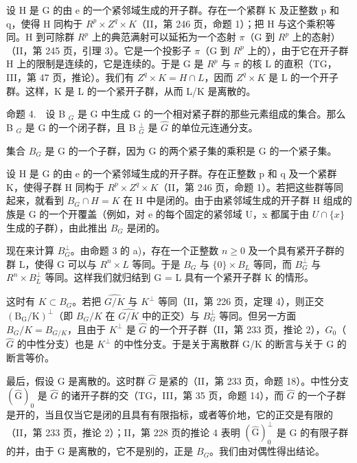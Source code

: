 设 H 是 G 的由 e 的一个紧邻域生成的开子群。存在一个紧群 K 及正整数 p 和 q，使得 H 同构于 \(R^{p} \times Z^{q} \times K\)（II，第 246 页，命题 1）；把 H 与这个乘积等同。H 到可除群 \(R^{p}\) 上的典范满射可以延拓为一个态射 \(\pi\)（G 到 \(R^{p}\) 上的态射）（II，第 245 页，引理 3）。它是一个投影子 \(\pi\)（G 到 \(R^{p}\) 上的），由于它在开子群 H 上的限制是连续的，它是连续的。于是 G 是 \(R^{p}\) 与 \(\pi\) 的核 L 的直积（TG，III，第 47 页，推论）。我们有 \(Z^{q} \times K = H \cap L\)，因而 \(Z^{q} \times K\) 是 L 的一个开子群。这样，K 是 L 的一个紧开子群，从而 L/K 是离散的。

命题 4.　设 B \(_{G}\) 是 G 中生成 G 的一个相对紧子群的那些元素组成的集合。那么 B \(_{G}\) 是 G 的一个闭子群，且 B \(_{G}^{\perp}\) 是 \(\widehat{G}\) 的单位元连通分支。

集合 \(B_{G}\) 是 G 的一个子群，因为 G 的两个紧子集的乘积是 G 的一个紧子集。

设 H 是 G 的由 e 的一个紧邻域生成的开子群。存在正整数 p 和 q 及一个紧群 K，使得子群 H 同构于 \(R^{p} \times Z^{q} \times K\)（II，第 246 页，命题 1）。若把这些群等同起来，就看到 \(B_{G} \cap H = K\) 在 H 中是闭的。由于由紧邻域生成的开子群 H 组成的族是 G 的一个开覆盖（例如，对 e 的每个固定的紧邻域 U，x 都属于由 \(U \cap \{x\}\) 生成的子群），由此推出 \(B_{G}\) 是闭的。

现在来计算 \(B_{G}^{\perp}\)。由命题 3 的 a)，存在一个正整数 \(n \geqslant 0\) 及一个具有紧开子群的群 L，使得 G 可以与 \(R^{n} \times L\) 等同。于是 \(B_{G}\) 与 \(\{0\} \times B_{L}\) 等同，而 \(B_{G}^{\perp}\) 与 \(R^{n} \times B_{L}^{\perp}\) 等同。这样我们就归结到 G = L 具有一个紧开子群 K 的情形。

这时有 \(K \subset B_{G}\)。若把 \(\widehat{G/K}\) 与 \(K^{\perp}\) 等同（II，第 226 页，定理 4），则正交 \((\mathrm{B}_{\mathrm{G}}/\mathrm{K})^{\perp}\)（即 \(B_{G}/K\) 在 \(\widehat{G/K}\) 中的正交）与 \(B_{G}^{\perp}\) 等同。但另一方面 \(B_{G}/K = B_{G/K}\)，且由于 \(K^{\perp}\) 是 \(\widehat{G}\) 的一个开子群（II，第 233 页，推论 2），\(\widehat{G}_{0}\)（\(\widehat{G}\) 的中性分支）也是 \(K^{\perp}\) 的中性分支。于是关于离散群 G/K 的断言与关于 G 的断言等价。

最后，假设 G 是离散的。这时群 \(\widehat{G}\) 是紧的（II，第 233 页，命题 18）。中性分支 \((\widehat{\mathrm{G}})_{0}\) 是 \(\widehat{G}\) 的诸开子群的交（TG，III，第 35 页，命题 14），而 \(\widehat{G}\) 的一个子群是开的，当且仅当它是闭的且具有有限指标，或者等价地，它的正交是有限的（II，第 233 页，推论 2）；II，第 228 页的推论 4 表明 \((\widehat{\mathrm{G}})_{0}^{\perp}\) 是 G 的有限子群的并，由于 G 是离散的，它不是别的，正是 \(B_{G}\)。我们由对偶性得出结论。

